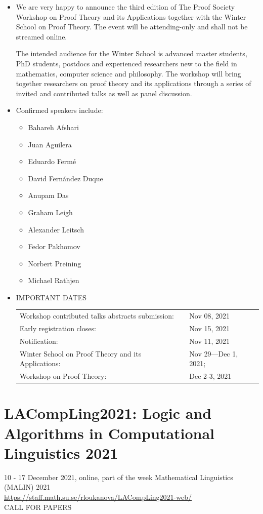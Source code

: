 \documentclass[prodmode,acmtecs]{acmsmall} %
\begin{document}
\begin{itemize}\item  We are very happy to announce the third edition of The Proof Society Workshop on Proof Theory and its Applications together with the Winter School on Proof Theory. The event will be attending-only and shall not be streamed online.  
 
  The intended audience for the Winter School is advanced master students, PhD students, postdocs and experienced researchers new to the field in mathematics, computer science and philosophy. The workshop will bring together researchers on proof theory and its applications through a series of invited and contributed talks as well as panel discussion. 
 
\item  Confirmed speakers include: 
 
\begin{itemize}\item Bahareh Afshari  
\item Juan Aguilera  
\item Eduardo Fermé  
\item David Fernández Duque  
\item Anupam Das  
\item Graham Leigh  
\item Alexander Leitsch  
\item Fedor Pakhomov  
\item Norbert Preining  
\item Michael Rathjen
\end{itemize} 
\item   IMPORTANT DATES  
 
\begin{tabulary}{\linewidth}{LL}Workshop contributed talks abstracts submission:  & Nov 08, 2021 \\
Early registration closes:  & Nov 15, 2021 \\
Notification:  & Nov 11, 2021 \\
Winter School on Proof Theory and its Applications:  & Nov 29—Dec 1, 2021; \\
Workshop on Proof Theory:  & Dec 2-3, 2021 \\
\end{tabulary}
 
\end{itemize}\section{LACompLing2021: Logic and Algorithms in Computational Linguistics 2021}\label{LACompLing2021}  10 - 17 December 2021, online, part of the week Mathematical Linguistics (MALIN) 2021\\ 
  \href{https://staff.math.su.se/rloukanova/LACompLing2021-web/}{https://staff.math.su.se/rloukanova/LACompLing2021-web/}\\ 
CALL FOR PAPERS 
\end{document}
